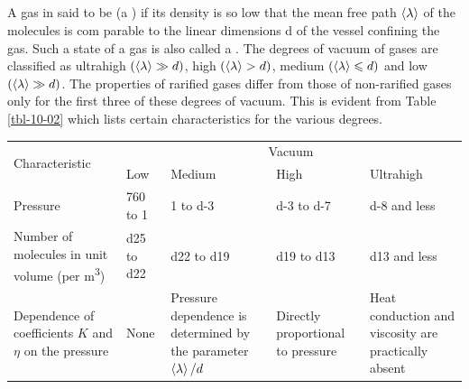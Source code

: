 \subsection{}\label{10.9.1} A gas in said to be  (a ) if its density is so low that the mean free path $\expval{\lambda}$ of the molecules is com­ parable to the linear dimensions d of the vessel confining the gas. Such a state of a gas is also called a . The degrees of vacuum of gases are classified as ultrahigh $(\expval{\lambda} \gg d)$, high $(\expval{\lambda} > d)$, medium $(\expval{\lambda} \leqslant d)$ and low $(\expval{\lambda} \gg d)$. The proper­ties of rarified gases differ from those of non-rarified gases only for the first three of these degrees of vacuum. This is evident from Table \ref{tbl-10-02} which lists certain characteristics for the various degrees.




\begin{table}
\centering
\begin{footnotesize}
\begin{tabular}{p{2cm}p{1.75cm}p{1.75cm}p{1.75cm}p{1.75cm}}
\toprule
\multirow{2}{*}{Characteristic}   & \multicolumn{4}{c}{Vacuum}   \\
 & Low & Medium & High & Ultrahigh  \\
\midrule
Pressure &   \num{760} to \num{1}  &    \num{1} to \num{d-3}    &    \num{d-3} to  \num{d-7}  &   \num{d-8} and less\\[5pt]
Number of molecules in unit volume (per \si{\meter\cubed}) &    \num{d25} to  \num{d22}  &   \num{d22} to  \num{d19}     &    \num{d19} to  \num{d13}  & \num{d13} and less            \\[5pt]
Dependence
of coeffic­ients $K$ and $\eta$ on the pres­sure          &   None  &     Pressure dependence is deter­mined by the parameter $\expval{\lambda}/d$  & Directly proportional to pressure      &  Heat conduction and viscosity are practically absent         \\
\bottomrule                          
\end{tabular}
\end{footnotesize}
\end{table}


